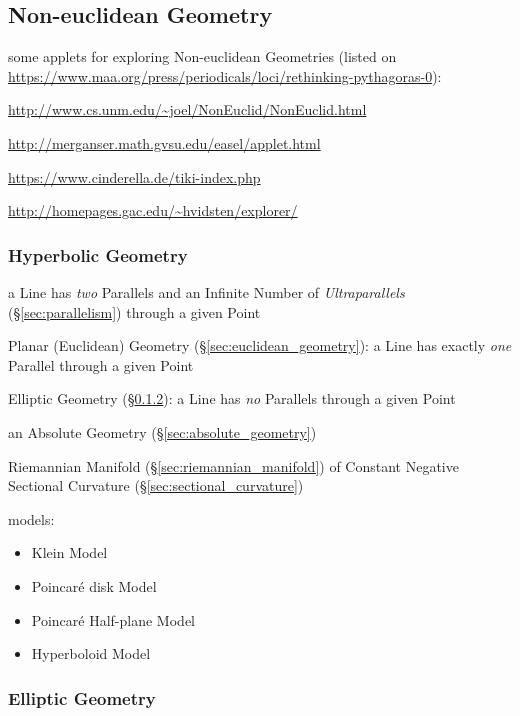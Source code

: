 \subsection{Non-euclidean Geometry}\label{sec:noneuclidean_geometry}

some applets for exploring Non-euclidean Geometries (listed on
\url{https://www.maa.org/press/periodicals/loci/rethinking-pythagoras-0}):

\url{http://www.cs.unm.edu/~joel/NonEuclid/NonEuclid.html}

\url{http://merganser.math.gvsu.edu/easel/applet.html}

\url{https://www.cinderella.de/tiki-index.php}

\url{http://homepages.gac.edu/~hvidsten/explorer/}



\subsubsection{Hyperbolic Geometry}\label{sec:hyperbolic_geometry}

a Line has \emph{two} Parallels and an Infinite Number of \emph{Ultraparallels}
(\S\ref{sec:parallelism}) through a given Point

\fist Planar (Euclidean) Geometry (\S\ref{sec:euclidean_geometry}): a Line has
  exactly \emph{one} Parallel through a given Point

\fist Elliptic Geometry (\S\ref{sec:elliptic_geometry}): a Line has \emph{no}
  Parallels through a given Point

an Absolute Geometry (\S\ref{sec:absolute_geometry})


Riemannian Manifold (\S\ref{sec:riemannian_manifold}) of Constant Negative
Sectional Curvature (\S\ref{sec:sectional_curvature})

models:
\begin{itemize}
  \item Klein Model
  \item Poincar\'e disk Model
  \item Poincar\'e Half-plane Model
  \item Hyperboloid Model
\end{itemize}



\subsubsection{Elliptic Geometry}\label{sec:elliptic_geometry}


